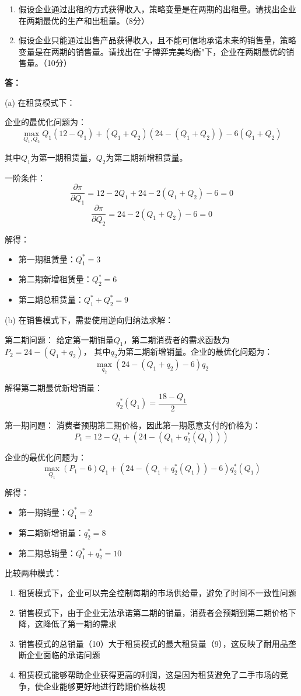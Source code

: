 \documentclass[12pt]{article}
\begin{document}
\begin{enumerate}
\item 假设企业通过出租的方式获得收入，策略变量是在两期的出租量。请找出企业在两期最优的生产和出租量。（8分）
\item 假设企业只能通过出售产品获得收入，且不能可信地承诺未来的销售量，策略变量是在两期的销售量。请找出在"子博弈完美均衡"下，企业在两期最优的销售量。（10分）
\end{enumerate}

\noindent\textbf{答：}

(a) 在租赁模式下：

企业的最优化问题为：
\[\max_{Q_1,Q_2} Q_1(12-Q_1) + (Q_1+Q_2)(24-(Q_1+Q_2)) - 6(Q_1+Q_2)\]

其中$Q_1$为第一期租赁量，$Q_2$为第二期新增租赁量。

一阶条件：
\[\frac{\partial \pi}{\partial Q_1} = 12-2Q_1 + 24-2(Q_1+Q_2) - 6 = 0\]
\[\frac{\partial \pi}{\partial Q_2} = 24-2(Q_1+Q_2) - 6 = 0\]

解得：
\begin{itemize}
\item 第一期租赁量：$Q_1^* = 3$
\item 第二期新增租赁量：$Q_2^* = 6$
\item 第二期总租赁量：$Q_1^* + Q_2^* = 9$
\end{itemize}

(b) 在销售模式下，需要使用逆向归纳法求解：

第二期问题：
给定第一期销量$Q_1$，第二期消费者的需求函数为$P_2 = 24 - (Q_1 + q_2)$，
其中$q_2$为第二期新增销量。企业的最优化问题为：
\[\max_{q_2} (24-(Q_1+q_2)-6)q_2\]

解得第二期最优新增销量：
\[q_2^*(Q_1) = \frac{18-Q_1}{2}\]

第一期问题：
消费者预期第二期价格，因此第一期愿意支付的价格为：
\[P_1 = 12-Q_1 + (24-(Q_1+q_2^*(Q_1)))\]

企业的最优化问题为：
\[\max_{Q_1} (P_1-6)Q_1 + (24-(Q_1+q_2^*(Q_1))-6)q_2^*(Q_1)\]

解得：
\begin{itemize}
\item 第一期销量：$Q_1^* = 2$
\item 第二期新增销量：$q_2^* = 8$
\item 第二期总销量：$Q_1^* + q_2^* = 10$
\end{itemize}

比较两种模式：
\begin{enumerate}
\item 租赁模式下，企业可以完全控制每期的市场供给量，避免了时间不一致性问题
\item 销售模式下，由于企业无法承诺第二期的销量，消费者会预期到第二期价格下降，这降低了第一期的需求
\item 销售模式的总销量（10）大于租赁模式的最大租赁量（9），这反映了耐用品垄断企业面临的承诺问题
\item 租赁模式能够帮助企业获得更高的利润，这是因为租赁避免了二手市场的竞争，使企业能够更好地进行跨期价格歧视
\end{enumerate}
\end{document}
